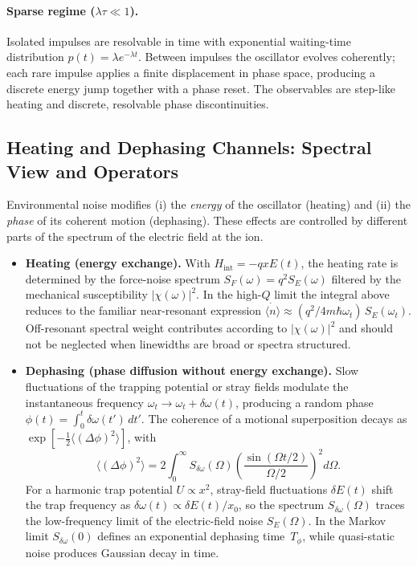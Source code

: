 \paragraph{Sparse regime ($\lambda\tau\!\ll\!1$).}
Isolated impulses are resolvable in time with exponential waiting-time
distribution $p(t)=\lambda e^{-\lambda t}$.  Between impulses the oscillator
evolves coherently; each rare impulse applies a finite displacement in
phase space, producing a discrete energy jump together with a phase reset.
The observables are step-like heating and discrete, resolvable phase
discontinuities.

\subsection*{Heating and Dephasing Channels: Spectral View and Operators}

Environmental noise modifies (i) the \emph{energy} of the oscillator
(heating) and (ii) the \emph{phase} of its coherent motion (dephasing).
These effects are controlled by different parts of the spectrum of the
electric field at the ion.

\begin{itemize}
  \item \textbf{Heating (energy exchange).}
  With $H_\mathrm{int}=-q x E(t)$, the heating rate is determined by the
  force-noise spectrum $S_F(\omega)=q^2 S_E(\omega)$ filtered by the
  mechanical susceptibility $|\chi(\omega)|^{2}$.  In the high-$Q$ limit the
  integral above reduces to the familiar near-resonant expression
  $\dot{\langle n\rangle}\!\approx\! (q^{2}/4m\hbar\omega_t)\,S_E(\omega_t)$.
  Off-resonant spectral weight contributes according to
  $|\chi(\omega)|^{2}$ and should not be neglected when linewidths are broad
  or spectra structured.

  \item \textbf{Dephasing (phase diffusion without energy exchange).}
  Slow fluctuations of the trapping potential or stray fields modulate the
  instantaneous frequency
  $\omega_t\!\rightarrow\!\omega_t+\delta\omega(t)$,
  producing a random phase
  $\phi(t)=\int_{0}^{t}\delta\omega(t')\,dt'.$
  The coherence of a motional superposition decays as
  $\exp[-\tfrac{1}{2}\langle(\Delta\phi)^{2}\rangle]$, with
  \[
    \langle(\Delta\phi)^{2}\rangle
      = 2\!\int_{0}^{\infty}\! S_{\delta\omega}(\Omega)
        \!\left(\frac{\sin(\Omega t/2)}{\Omega/2}\right)^{2}\! d\Omega .
  \]
  For a harmonic trap potential $U\!\propto\!x^{2}$, stray-field
  fluctuations $\delta E(t)$ shift the trap frequency as
  $\delta\omega(t)\!\propto\!\delta E(t)/x_{0}$,
  so the spectrum $S_{\delta\omega}(\Omega)$ traces the
  low-frequency limit of the electric-field noise $S_{E}(\Omega)$.
  In the Markov limit $S_{\delta\omega}(0)$ defines an exponential
  dephasing time~$T_{\phi}$, while quasi-static noise produces Gaussian
  decay in time.
\end{itemize}

